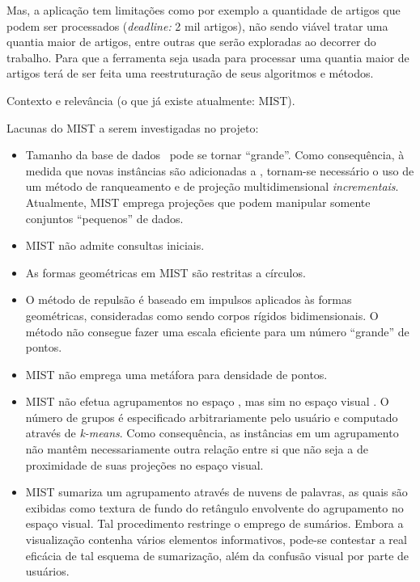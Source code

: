  Mas, a aplicação tem limitações como por exemplo a quantidade de artigos que podem ser processados (\textit{deadline:} 2 mil artigos), não sendo viável tratar uma quantia maior de artigos, entre outras que serão exploradas ao decorrer do trabalho. Para que a ferramenta seja usada para processar uma quantia maior de artigos terá de ser feita uma reestruturação de seus algoritmos e métodos.

Contexto e relevância (o que já existe atualmente: MIST).

Lacunas do MIST a serem investigadas no projeto:
\begin{itemize}
	\item Tamanho da base de dados \DB\ pode se tornar ``grande''. Como consequência, à medida que novas instâncias são adicionadas a \DB,
	tornam-se necessário o uso de um método de ranqueamento e de projeção
	multidimensional \emph{incrementais}. Atualmente, MIST emprega
	projeções que podem manipular somente conjuntos ``pequenos'' de
	dados.
	
	\item MIST não admite consultas iniciais.
	
	\item As formas geométricas em MIST são restritas a círculos.
	
	\item O método de repulsão é baseado em impulsos aplicados às formas
	geométricas, consideradas como sendo corpos rígidos
	bidimensionais. O método não consegue fazer uma escala eficiente para um número
	``grande'' de pontos.
	
	\item MIST não emprega uma metáfora para densidade de pontos.
	
	\item MIST não efetua agrupamentos no espaço , mas sim no
	espaço visual . O número de grupos é especificado
	arbitrariamente pelo usuário e computado através de
	\emph{k-means}. Como consequência, as instâncias em um agrupamento
	não mantêm necessariamente outra relação entre si que não seja a de
	proximidade de suas projeções no espaço visual.
	
	\item MIST sumariza um agrupamento através de nuvens de palavras, as quais são exibidas como textura de fundo do retângulo envolvente do agrupamento no espaço visual. Tal procedimento restringe o emprego	de sumários. Embora a visualização contenha vários elementos
	informativos, pode-se contestar a real eficácia de tal esquema de	sumarização, além da confusão visual por parte de usuários.
	
\end{itemize}


